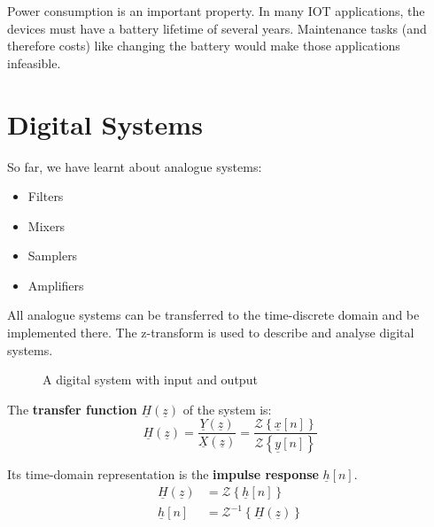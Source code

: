 \begin{refsection}
\begin{fact}
	Power consumption is an important property. In many \ac{IOT} applications, the devices must have a battery lifetime of several years. Maintenance tasks (and therefore costs) like changing the battery would make those applications infeasible.
\end{fact}

\section{Digital Systems}

So far, we have learnt about analogue systems:
\begin{itemize}
	\item Filters
	\item Mixers
	\item Samplers
	\item Amplifiers
\end{itemize}

All analogue systems can be transferred to the time-discrete domain and be implemented there. The z-transform is used to describe and analyse digital systems.
\begin{figure}[H]
	\centering
	\caption{A digital system with input and output}
\end{figure}

The  \textbf{transfer function} $\underline{H}(\underline{z})$ of the system is:
\begin{equation}
	\underline{H}(\underline{z}) = \frac{\underline{Y}(\underline{z})}{\underline{X}(\underline{z})} = \frac{\mathcal{Z}\left\{\underline{x}[n]\right\}}{\mathcal{Z}\left\{\underline{y}[n]\right\}}
\end{equation}

Its time-domain representation is the  \textbf{impulse response} $\underline{h}[n]$.
\begin{subequations}
	\begin{align}
		\underline{H}(\underline{z}) &= \mathcal{Z}\left\{\underline{h}[n]\right\} \\
		\underline{h}[n] &= \mathcal{Z}^{-1}\left\{\underline{H}(\underline{z})\right\}
	\end{align}
\end{subequations}


\end{refsection}
